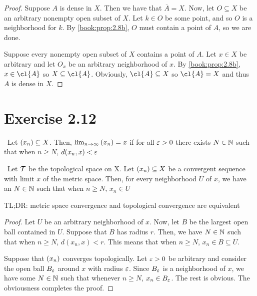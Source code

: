 \documentclass{article}
\begin{document}
\begin{proof}
    \forwarddir Suppose $A$ is dense in $X$. Then we have that $\overline{A} = X$.
    Now, let $O \subseteq X$ be an arbitrary nonempty open subset of $X$. Let $k \in O$
    be some point, and so $O$ is a neighborhood for $k$. By \cref{book:prop:2.8b}, $O$ must
    contain a point of $A$, so we are done.

    \conversedir Suppose every nonempty open subset of $X$ contains a point of $A$.
    Let $x \in X$ be arbitrary and let $O_x$ be an arbitrary neighborhood of $x$.
    By \cref{book:prop:2.8b}, $x \in \cl{A}$ so $X \subseteq \cl{A}$.
    Obviously, $\cl{A} \subseteq X$ so $\cl{A} = X$ and thus $A$ is dense in $X$.
\end{proof}


\newpage
\section{Exercise 2.12}

\begin{recall}
\metricspace \, Let $\left(x_{n}\right) \subseteq X$. Then, $ \lim_{n \to \infty}{\left(x_{n}\right)}  = x$ if 
for all $\varepsilon > 0$ there exists $N \in \mathbb{N}$ such that when $n \geq N$, $d(x_n, x) < \varepsilon$
\end{recall}

\begin{proposition}
\label{book:ex:2.12}
\metricspace \, Let $\mathcal{T}$ be the topological space on X. Let $\left(x_{n}\right) \subseteq X$
be a convergent sequence with limit $x$ of the metric space.
Then, for every neighborhood $U$ of $x$, we have an $N \in \mathbb{N}$
such that when $n \geq N$, $x_n \in U$ 

TL;DR: metric space convergence and topological convergence are equivalent 
\end{proposition}

\begin{proof}
    Let $U$ be an arbitrary neighborhood of $x$.
    Now, let $B$ be the largest open ball contained in $U$.
    Suppose that $B$ has radius $r$. Then, we have $N \in \mathbb{N}$
    such that when $n \geq N$, $d(x_n, x) < r$. This means that
    when $n \geq N$, $x_n \in B \subseteq U$.

    Suppose that $\left(x_{n}\right)$ converges topologically. 
    Let $\varepsilon > 0$ be arbitrary and consider the open ball
    $B_\varepsilon$ around $x$ with radius $\varepsilon$. Since $B_\varepsilon$ is
    a neighborhood of $x$, we have some $N \in \mathbb{N}$ such that
    whenever $n \geq N$, $x_n \in B_\varepsilon$. The rest is obvious.
    The obviousness completes the proof.
\end{proof}
\end{document}
